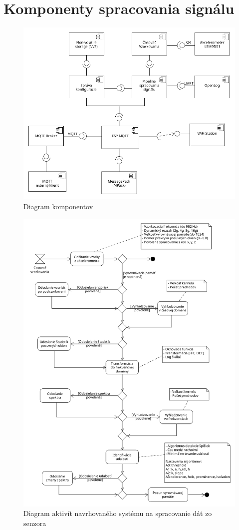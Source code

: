 \section{Komponenty spracovania signálu}
\begin{figure}[h]
	\centering
	\includegraphics[width=\textwidth]{figures/design/components.png}
	\caption{Diagram komponentov}
\end{figure}

\begin{figure}[h]
	\centering
	\includegraphics[width=\textwidth]{figures/design/pipeline.png}
	\caption{Diagram aktivít navrhovaného systému na spracovanie dát zo senzora}
\end{figure}

